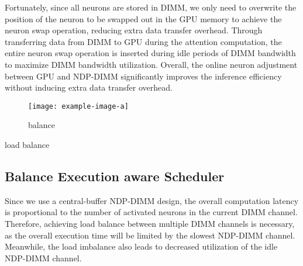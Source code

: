 Fortunately, since all neurons are stored in DIMM, we only need to overwrite the position of the neuron to be swapped out in the GPU memory to achieve the neuron swap operation, reducing extra data transfer overhead. Through transferring data from DIMM to GPU during the attention computation, the entire neuron swap operation is inserted during idle periods of DIMM bandwidth to maximize DIMM bandwidth utilization. 
Overall, the online neuron adjustment between GPU and NDP-DIMM significantly improves the inference efficiency without inducing extra data transfer overhead.


\begin{figure}[t]
    \centering
    \texttt{[image: example-image-a]}
    \caption{balance}
    \label{fig:balance}
\end{figure}

\begin{algorithm}
    \caption{load balance}\label{alg:balance}
\end{algorithm}

\subsection{Balance Execution aware Scheduler}
Since we use a central-buffer NDP-DIMM design, the overall computation latency is proportional to the number of activated neurons in the current DIMM channel. Therefore, achieving load balance between multiple DIMM channels is necessary, as the overall execution time will be limited by the slowest NDP-DIMM channel. Meanwhile, the load imbalance also leads to decreased utilization of the idle NDP-DIMM channel.

